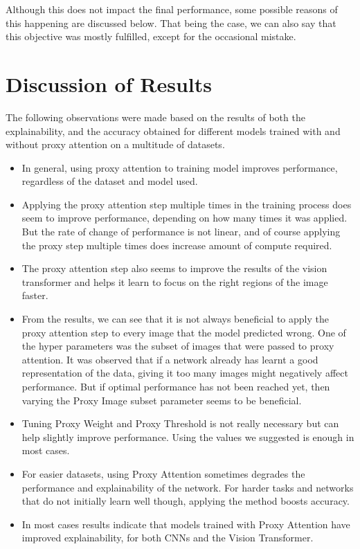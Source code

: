 \documentclass[a4paper,11pt,openright]{book}
\begin{document}
\begin{itemize}
Although this does not impact the final performance, some possible reasons of this happening are discussed below. That being the case, we can also say that this objective was mostly fulfilled, except for the occasional mistake.
\end{itemize}


\section{Discussion of Results}
The following observations were made based on the results of both the explainability, and the accuracy obtained for different models trained with and without proxy attention on a multitude of datasets.
\begin{itemize}
 \item In general, using proxy attention to training model improves performance, regardless of the dataset and model used.
 \item Applying the proxy attention step multiple times in the training process does seem to improve performance, depending on how many times it was applied. But the rate of change of performance is not linear, and of course applying the proxy step multiple times does increase amount of compute required.
 \item The proxy attention step also seems to improve the results of the vision transformer and helps it learn to focus on the right regions of the image faster.
 \item From the results, we can see that it is not always beneficial to apply the proxy attention step to every image that the model predicted wrong. One of the hyper parameters was the subset of images that were passed to proxy attention. It was observed that if a network already has learnt a good representation of the data, giving it too many images might negatively affect performance. But if optimal performance has not been reached yet, then varying the Proxy Image subset parameter seems to be beneficial.
 \item Tuning Proxy Weight and Proxy Threshold is not really necessary but can help slightly improve performance. Using the values we suggested is enough in most cases.
 \item For easier datasets, using Proxy Attention sometimes degrades the performance and explainability of the network. For harder tasks and networks that do not initially learn well though, applying the method boosts accuracy.
 \item In most cases results indicate that models trained with Proxy Attention have improved explainability, for both CNNs and the Vision Transformer.
\end{itemize}
\end{document}
